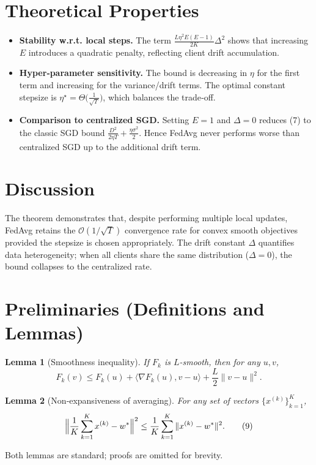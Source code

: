 \documentclass[11pt]{article}
\newtheorem{lemma}{Lemma}
\begin{document}
\section*{Theoretical Properties}
\begin{itemize}
  \item \textbf{Stability w.r.t. local steps.}
        The term \(\frac{L\eta^{2}E(E-1)}{2K}\Delta^{2}\) shows that
        increasing \(E\) introduces a quadratic penalty,
        reflecting client drift accumulation.
  \item \textbf{Hyper‑parameter sensitivity.}
        The bound is decreasing in \(\eta\) for the first term
        and increasing for the variance/drift terms.
        The optimal constant stepsize is
        \(\eta^{\star}= \Theta\bigl(\frac{1}{\sqrt{T}}\bigr)\), which
        balances the trade‑off.
  \item \textbf{Comparison to centralized SGD.}
        Setting \(E=1\) and \(\Delta=0\) reduces (7) to the classic
        SGD bound
        \(\frac{D^{2}}{2\eta T}+\frac{\eta\sigma^{2}}{2}\).
        Hence FedAvg never performs worse than centralized SGD up to
        the additional drift term.
\end{itemize}

\section*{Discussion}
The theorem demonstrates that, despite performing multiple local
updates, FedAvg retains the \(\mathcal{O}(1/\sqrt{T})\) convergence rate
for convex smooth objectives provided the stepsize is chosen appropriately.
The drift constant \(\Delta\) quantifies data heterogeneity; when all
clients share the same distribution (\(\Delta=0\)), the bound collapses
to the centralized rate.  

\section*{Preliminaries (Definitions and Lemmas)}
\begin{lemma}[Smoothness inequality]\label{lem:smooth}
If \(F_k\) is \(L\)-smooth, then for any \(u,v\),
\[
F_k(v)\le F_k(u)+\langle\nabla F_k(u),v-u\rangle
          +\frac{L}{2}\|v-u\|^{2}.
\tag{8}
\]
\end{lemma}
\begin{lemma}[Non‑expansiveness of averaging]\label{lem:avg}
For any set of vectors \(\{x^{(k)}\}_{k=1}^{K}\),
\[
\Bigl\|\frac1K\sum_{k=1}^{K}x^{(k)}-w^{*}\Bigr\|^{2}
    \le \frac1K\sum_{k=1}^{K}\|x^{(k)}-w^{*}\|^{2}.
\tag{9}
\]
\end{lemma}
Both lemmas are standard; proofs are omitted for brevity.
\end{document}
